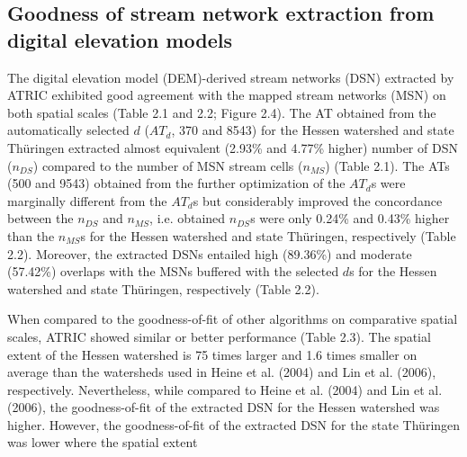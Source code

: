 \subsection{Goodness of stream network extraction from digital elevation models}
\label{Goodness of stream network extraction from digital elevation models}

The digital elevation model (DEM)-derived stream networks (DSN) extracted by ATRIC exhibited good agreement with the mapped stream networks (MSN) on both spatial scales (Table 2.1 and 2.2; Figure 2.4). The AT obtained from the automatically selected $d$ ($AT_d$, 370 and 8543) for the Hessen watershed and state Thüringen extracted almost equivalent (2.93\% and 4.77\% higher) number of DSN ($n_{DS}$) compared to the number of MSN stream cells ($n_{MS}$) (Table 2.1). The ATs (500 and 9543) obtained from the further optimization of the $AT_d$s were marginally different from the $AT_d$s but considerably improved the concordance between the $n_{DS}$ and $n_{MS}$, i.e. obtained $n_{DS}$s were only 0.24\% and 0.43\% higher than the $n_{MS}$s for the Hessen watershed and state Thüringen, respectively (Table 2.2). Moreover, the extracted DSNs entailed high (89.36\%) and moderate (57.42\%) overlaps with the MSNs buffered with the selected $d$s for the Hessen watershed and state Thüringen, respectively (Table 2.2).

When compared to the goodness-of-fit of other algorithms on comparative spatial scales, ATRIC showed similar or better performance (Table 2.3). The spatial extent of the Hessen watershed is 75 times larger and 1.6 times smaller on average than the watersheds used in Heine et al. (2004) and Lin et al. (2006), respectively. Nevertheless, while compared to Heine et al. (2004) and Lin et al. (2006), the goodness-of-fit of the extracted DSN for the Hessen watershed was higher. However, the goodness-of-fit of the extracted DSN for the state Thüringen was lower where the spatial extent

